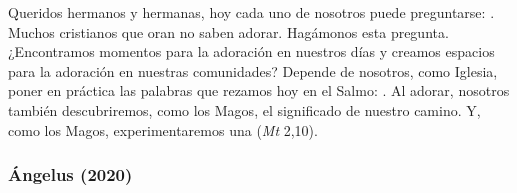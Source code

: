 \begin{body}
					Queridos hermanos y hermanas, hoy cada uno de nosotros puede preguntarse: . Muchos cristianos que oran no saben adorar. Hagámonos esta pregunta. ¿Encontramos momentos para la adoración en nuestros días y creamos espacios para la adoración en nuestras comunidades? Depende de nosotros, como Iglesia, poner en práctica las palabras que rezamos hoy en el Salmo: . Al adorar, nosotros también descubriremos, como los Magos, el significado de nuestro camino. Y, como los Magos, experimentaremos una  (\emph{Mt} 2,10).								
				\end{body}
			
			\subsubsection{Ángelus (2020)}
			
				
